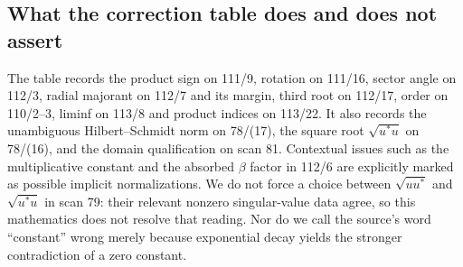 \subsection{What the correction table does and does not assert}
The table records the product sign on 111/9, rotation on 111/16, sector angle on 112/3, radial majorant on 112/7 and its margin, third root on 112/17, order on 110/2--3, liminf on 113/8 and product indices on 113/22. It also records the unambiguous Hilbert--Schmidt norm on 78/(17), the square root $\sqrt{u^*u}$ on 78/(16), and the domain qualification on scan 81. Contextual issues such as the multiplicative constant and the absorbed $\beta$ factor in 112/6 are explicitly marked as possible implicit normalizations. We do not force a choice between $\sqrt{uu^*}$ and $\sqrt{u^*u}$ in scan 79: their relevant nonzero singular-value data agree, so this mathematics does not resolve that reading. Nor do we call the source's word ``constant'' wrong merely because exponential decay yields the stronger contradiction of a zero constant.

